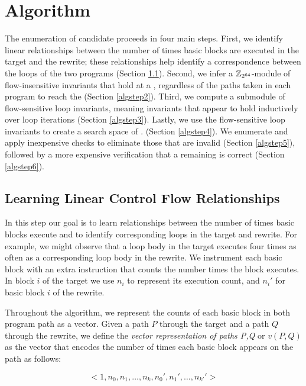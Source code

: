 \section{Algorithm}


The enumeration of candidate \bisimreps{} proceeds in four main steps.
First, we identify linear relationships between the number of times
basic blocks are executed in the target and the rewrite; these
relationships help identify a correspondence between the loops
of the two programs (Section \ref{algstep1}). Second, we infer
a $\mathbb{Z}_{2^{64}}$-module of flow-insensitive invariants that hold at a
\cutpoint, regardless of the paths taken in each program to reach the
\cutpoint{} (Section \ref{algstep2}). Third, we compute a submodule
of flow-sensitive loop invariants, meaning invariants that appear
to hold inductively over loop iterations (Section \ref{algstep3}).
Lastly, we use the flow-sensitive loop invariants to create a search
space of \bisimreps. (Section \ref{algstep4}). We enumerate \bisimreps and
apply inexpensive checks to eliminate those that are invalid (Section
\ref{algstep5}), followed by a more expensive verification that a
remaining \bisimrep{} is correct (Section \ref{algstep6}).


\subsection{Learning Linear Control Flow Relationships} \label{algstep1}

In this step our goal is to learn relationships between the number of
times basic blocks execute and to identify corresponding loops in the
target and rewrite. For example, we might observe that a loop body
in the target executes four times as often as a corresponding
loop body in the rewrite. We instrument each basic block with an extra
instruction that counts the number times the block executes. In block
$i$ of the target we use \shadow{} $n_i$ to represent its execution
count, and $n_i'$ for basic block $i$ of the rewrite.

Throughout the algorithm, we represent the counts of each basic
block in both program path as a vector.  Given a path $P$ through the
target and a path $Q$ through the rewrite, we define the \emph{vector
representation of paths P,Q} or $v(P,Q)$ as the vector that encodes
the number of times each basic block appears on the path as follows:

$$<1, n_0, n_1, \dotsc, n_k, n_0', n_1', \dotsc, n_{k'}'>$$

